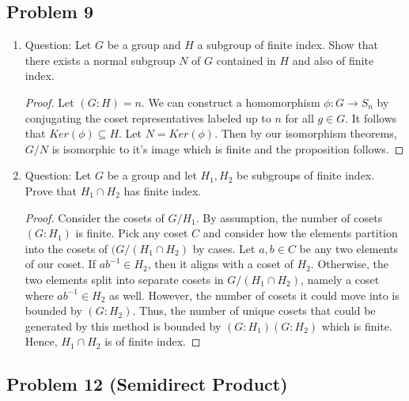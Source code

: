 \documentclass[12pt]{article}
\begin{document}
\subsection*{Problem 9}

\begin{enumerate}
\item 
Question: Let $G$ be a group and $H$ a subgroup of finite index. Show that there exists a normal subgroup $N$ of $G$ contained in $H$ and also of finite index.

\begin{proof}
Let $(G : H) = n$. We can construct a homomorphism $\phi: G \rightarrow S_n$ by conjugating the coset representatives labeled up to $n$ for all $g \in G$. It follows that $Ker(\phi) \subseteq H$. Let $N = Ker(\phi)$. Then by our isomorphism theorems, $G/N$ is isomorphic to it's image which is finite and the proposition follows.   
\end{proof}

\item
Question: Let $G$ be a group and let $H_1,H_2$ be subgroups of finite index. Prove that $H_1 \cap H_2$ has finite index.

\begin{proof}
Consider the cosets of $G/H_1$. By assumption, the number of cosets $(G:H_1)$ is finite. Pick any coset $C$ and consider how the elements partition into the cosets of $(G/(H_1 \cap H_2)$ by cases. Let $a,b \in C$ be any two elements of our coset. If $ab^{-1} \in H_2$, then it aligns with a coset of $H_2$. Otherwise, the two elements split into separate cosets in $G/(H_1 \cap H_2)$, namely a coset where $ab^{-1} \in H_2$ as well. However, the number of cosets it could move into is bounded by $(G:H_2)$. Thus, the number of unique cosets that could be generated by this method is bounded by $(G:H_1)(G:H_2)$ which is finite. Hence, $H_1 \cap H_2$ is of finite index. \end{proof}
\end{enumerate}

\subsection{Problem 12 (Semidirect Product)}
\end{document}
